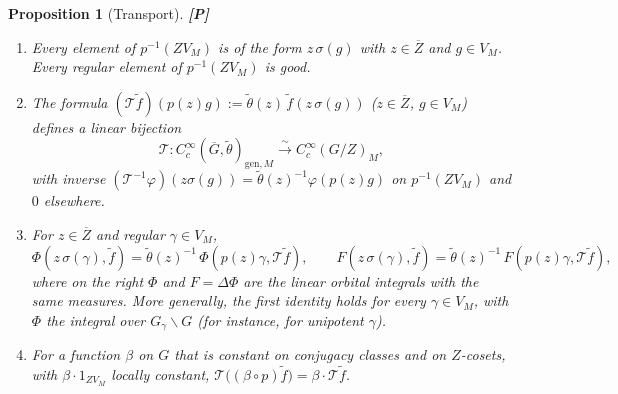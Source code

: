 \documentclass[12pt]{article}
\newcommand{\ov}[1]{\overline{#1}}
\newcommand{\gen}{\mathrm{gen}}
\newcommand{\Gb}{\ov{G}}
\newcommand{\Zb}{\ov{Z}}
\newcommand{\sg}{\sigma}
\newcommand{\Pv}{\textbf{[P]}}
\theoremstyle{plain}
\newtheorem{proposition}[theorem]{Proposition}
\theoremstyle{definition}
\begin{document}
\begin{proposition}[Transport]\label{prop:transport}\Pv
\begin{enumerate}[label=(\alph*)]
\item Every element of $p^{-1}(ZV_M)$ is of the form $z\,\sg(g)$ with $z\in\Zb$ and $g\in V_M$. Every regular element of $p^{-1}(ZV_M)$ is good.
\item The formula $(\mathcal T\tilde f)(p(z)g):=\tilde\theta(z)\,\tilde f(z\,\sg(g))$ ($z\in\Zb$, $g\in V_M$) defines a linear bijection
\[ \mathcal T:C_c^\infty(\Gb,\tilde\theta)_{\gen,M}\xrightarrow{\ \sim\ }C_c^\infty(G/Z)_M, \]
with inverse $(\mathcal T^{-1}\varphi)(z\sg(g))=\tilde\theta(z)^{-1}\varphi(p(z)g)$ on $p^{-1}(ZV_M)$ and $0$ elsewhere.
\item For $z\in\Zb$ and regular $\gamma\in V_M$,
\[ \Phi(z\,\sg(\gamma),\tilde f)=\tilde\theta(z)^{-1}\,\Phi(p(z)\gamma,\mathcal T\tilde f),\qquad F(z\,\sg(\gamma),\tilde f)=\tilde\theta(z)^{-1}\,F(p(z)\gamma,\mathcal T\tilde f), \]
where on the right $\Phi$ and $F=\Delta\Phi$ are the linear orbital integrals with the same measures. More generally, the first identity holds for every $\gamma\in V_M$, with $\Phi$ the integral over $G_\gamma\backslash G$ (for instance, for unipotent $\gamma$).
\item For a function $\beta$ on $G$ that is constant on conjugacy classes and on $Z$-cosets, with $\beta\cdot1_{ZV_M}$ locally constant, $\mathcal T\big((\beta\circ p)\tilde f\big)=\beta\cdot\mathcal T\tilde f$.
\end{enumerate}
\end{proposition}
\end{document}

